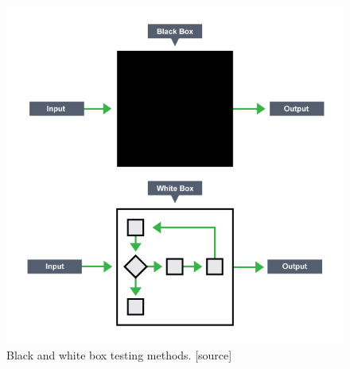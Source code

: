 \documentclass[english,12pt,a4paper,pdftex,elec,utf8]{aaltothesis}
\begin{document}
\begin{figure}[h!]
\centering
\includegraphics[scale=0.3]{blackvswhite}
\caption{Black and white box testing methods. [source]}
\label{boxfigurespuge}
\end{figure} 
\end{document}
